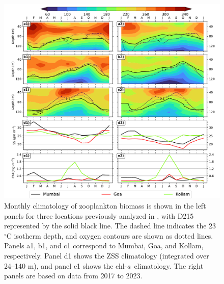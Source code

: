 \documentclass[12pt,a4paper]{article}
\newcommand{\chla}{chl-{\emph{a}}}
\begin{document}
\begin{figure}[htbp]
	\centering
	\includegraphics[width=\textwidth]{./figures/climatology_comparison_aparna_ranjan.pdf} 
	\caption{Monthly climatology of zooplankton biomass is shown in the left panels for three locations previously analyzed in \citep{aparna2022seasonal}, with D215 represented by the solid black line. The dashed line indicates the 23~$^\circ$C isotherm depth, and oxygen contours are shown as dotted lines. Panels a1, b1, and c1 correspond to Mumbai, Goa, and Kollam, respectively. Panel d1 shows the ZSS climatology (integrated over 24--140 m), and panel e1 shows the \chla\ climatology. The right panels are based on data from 2017 to 2023.}
	\label{fig:zsschlclimcomp}
\end{figure}
\end{document}
